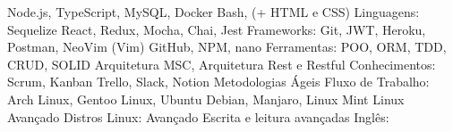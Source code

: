 \begin{cvhonors}
  \cvhonor
    {Node.js, TypeScript, MySQL, Docker}
    {Bash, (+ HTML e CSS)}
    {}
    {Linguagens:}
  \cvhonor
    {Sequelize}
    {React, Redux, Mocha, Chai, Jest}
    {}
    {Frameworks:}
  \cvhonor
    {Git, JWT, Heroku, Postman, NeoVim (Vim)}
    {GitHub, NPM, nano}
    {}
    {Ferramentas:}
 \cvhonor
    {POO, ORM, TDD, CRUD, SOLID}
    {Arquitetura MSC, Arquitetura Rest e Restful}
    {}
    {Conhecimentos:}
  \cvhonor
    {Scrum, Kanban}
    {Trello, Slack, Notion}
    {Metodologias Ágeis}
    {Fluxo de Trabalho:}
  \cvhonor
    {Arch Linux, Gentoo Linux, Ubuntu}
    {Debian, Manjaro, Linux Mint}
    {Linux Avançado}
    {Distros Linux:}
  \cvhonor
    {Avançado}
    {Escrita e leitura avançadas}
    {}
    {Inglês:}
\end{cvhonors}

\vspace{.5cm}

